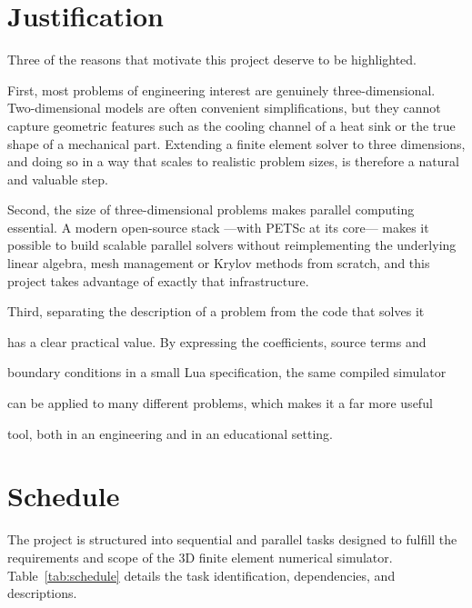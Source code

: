 \documentclass[GREVA,english,openany]{tfe-eseiaat}
\begin{document}
\chapter{Justification}

Three of the reasons that motivate this project deserve to be highlighted.

First, most problems of engineering interest are genuinely
three-dimensional. Two-dimensional models are often convenient
simplifications, but they cannot capture geometric features such as the
cooling channel of a heat sink or the true shape of a mechanical part.
Extending a finite element solver to three dimensions, and doing so in a way
that scales to realistic problem sizes, is therefore a natural and valuable
step.

Second, the size of three-dimensional problems makes parallel computing
essential. A modern open-source stack ---with PETSc \cite{petsc-user-ref} at
its core--- makes it possible to build scalable parallel solvers without
reimplementing the underlying linear algebra, mesh management or Krylov
methods \cite{saad2003iterative} from scratch, and this project takes
advantage of exactly that infrastructure.

Third, separating the description of a problem from the code that solves it

has a clear practical value. By expressing the coefficients, source terms and

boundary conditions in a small Lua specification, the same compiled simulator

can be applied to many different problems, which makes it a far more useful

tool, both in an engineering and in an educational setting.

\chapter{Schedule}

The project is structured into sequential and parallel tasks designed to fulfill the requirements and scope of the 3D finite element numerical simulator. Table~\ref{tab:schedule} details the task identification, dependencies, and descriptions.
\end{document}
